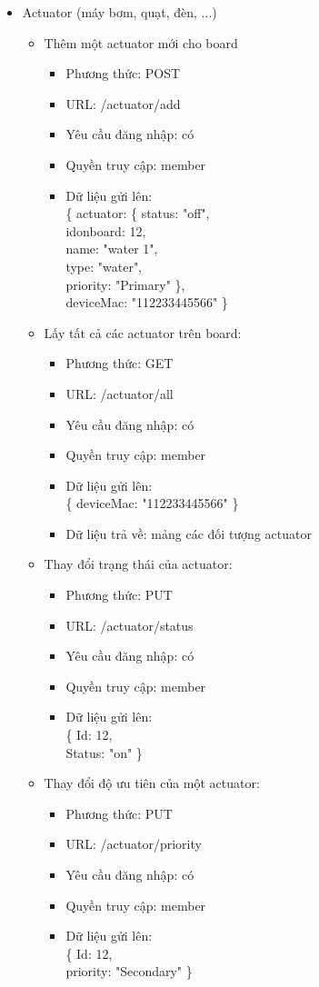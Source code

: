 \documentclass[a4paper,12pt,oneside]{article}
\begin{document}
\begin{itemize}
\item Actuator (máy bơm, quạt, đèn, ...)
\begin{itemize}
\item Thêm một actuator mới cho board
\begin{itemize}
	\item Phương thức: POST
	\item URL: /actuator/add
	\item Yêu cầu đăng nhập: có
	\item Quyền truy cập: member
	\item Dữ liệu gửi lên:\\ 
		\{
  			actuator: \{
  				status: "off",\\
  				idonboard: 12,\\
  				name: "water 1", \\
  				type: "water",\\
  				priority: "Primary"
  			\},\\
  			deviceMac: "112233445566"
		\}
	\end{itemize} 
	
\item Lấy tất cả các actuator trên board:
\begin{itemize}
	\item Phương thức: GET
	\item URL: /actuator/all
	\item Yêu cầu đăng nhập: có
	\item Quyền truy cập: member
	\item Dữ liệu gửi lên:\\ 
		\{
  			deviceMac: "112233445566"
		\}
	\item Dữ liệu trả về: mảng các đối tượng actuator
	\end{itemize}

\item Thay đổi trạng thái của actuator:
\begin{itemize}
	\item Phương thức: PUT
	\item URL: /actuator/status
	\item Yêu cầu đăng nhập: có
	\item Quyền truy cập: member
	\item Dữ liệu gửi lên:\\ 
		\{
			Id: 12,\\
			Status: "on"
		\}
	\end{itemize}

\item Thay đổi độ ưu tiên của một actuator:
\begin{itemize}
	\item Phương thức: PUT
	\item URL: /actuator/priority
	\item Yêu cầu đăng nhập: có
	\item Quyền truy cập: member
	\item Dữ liệu gửi lên:\\ 
		\{
			Id: 12,\\
			priority: "Secondary"
		\}
	\end{itemize}


\end{itemize}
\end{itemize}
\end{document}

